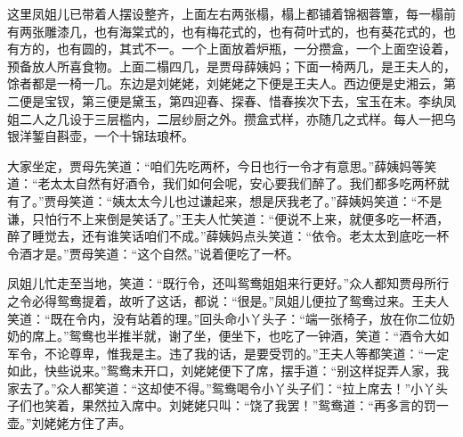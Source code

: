 这里凤姐儿已带着人摆设整齐，上面左右两张榻，榻上都铺着锦裀蓉簟，每一榻前有两张雕漆几，也有海棠式的，也有梅花式的，也有荷叶式的，也有葵花式的，也有方的，也有圆的，其式不一。一个上面放着炉瓶，一分攒盒，一个上面空设着，预备放人所喜食物。上面二榻四几，是贾母薛姨妈；下面一椅两几，是王夫人的，馀者都是一椅一几。东边是刘姥姥，刘姥姥之下便是王夫人。西边便是史湘云，第二便是宝钗，第三便是黛玉，第四迎春、探春、惜春挨次下去，宝玉在末。李纨凤姐二人之几设于三层槛内，二层纱厨之外。攒盒式样，亦随几之式样。每人一把乌银洋錾自斟壶，一个十锦珐琅杯。

大家坐定，贾母先笑道：``咱们先吃两杯，今日也行一令才有意思。''薛姨妈等笑道：``老太太自然有好酒令，我们如何会呢，安心要我们醉了。我们都多吃两杯就有了。''贾母笑道：``姨太太今儿也过谦起来，想是厌我老了。''薛姨妈笑道：``不是谦，只怕行不上来倒是笑话了。''王夫人忙笑道：``便说不上来，就便多吃一杯酒，醉了睡觉去，还有谁笑话咱们不成。''薛姨妈点头笑道：``依令。老太太到底吃一杯令酒才是。''贾母笑道：``这个自然。''说着便吃了一杯。

凤姐儿忙走至当地，笑道：``既行令，还叫鸳鸯姐姐来行更好。''众人都知贾母所行之令必得鸳鸯提着，故听了这话，都说：``很是。''凤姐儿便拉了鸳鸯过来。王夫人笑道：``既在令内，没有站着的理。''回头命小丫头子：``端一张椅子，放在你二位奶奶的席上。''鸳鸯也半推半就，谢了坐，便坐下，也吃了一钟酒，笑道：``酒令大如军令，不论尊卑，惟我是主。违了我的话，是要受罚的。''王夫人等都笑道：``一定如此，快些说来。''鸳鸯未开口，刘姥姥便下了席，摆手道：``别这样捉弄人家，我家去了。''众人都笑道：``这却使不得。''鸳鸯喝令小丫头子们：``拉上席去！''小丫头子们也笑着，果然拉入席中。刘姥姥只叫：``饶了我罢！''鸳鸯道：``再多言的罚一壶。''刘姥姥方住了声。

